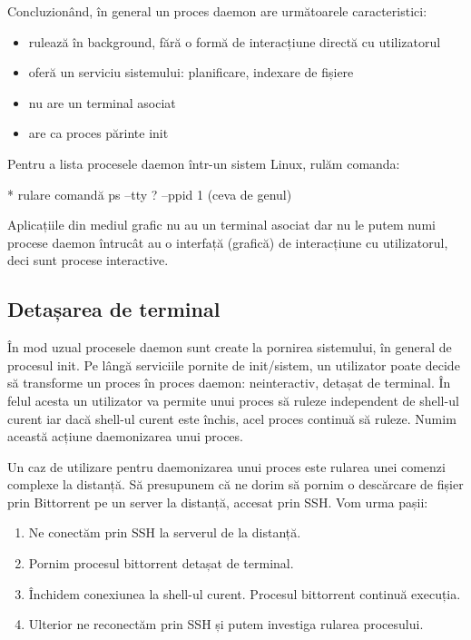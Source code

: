 Concluzionând, în general un proces daemon are următoarele caracteristici:

\begin{itemize}
	\item rulează în background, fără o formă de interacțiune directă cu utilizatorul
	\item oferă un serviciu sistemului: planificare, indexare de fișiere
	\item nu are un terminal asociat
	\item are ca proces părinte init
\end{itemize}

Pentru a lista procesele daemon într-un sistem Linux, rulăm comanda:

* rulare comandă ps --tty ? --ppid 1 (ceva de genul)

Aplicațiile din mediul grafic nu au un terminal asociat dar nu le putem numi
procese daemon întrucât au o interfață (grafică) de interacțiune cu
utilizatorul, deci sunt procese interactive.

\subsection{Detașarea de terminal}

În mod uzual procesele daemon sunt create la pornirea sistemului, în general de
procesul init. Pe lângă serviciile pornite de init/sistem, un utilizator poate
decide să transforme un proces în proces daemon: neinteractiv, detașat de
terminal. În felul acesta un utilizator va permite unui proces să ruleze
independent de shell-ul curent iar dacă shell-ul curent este închis, acel proces
continuă să ruleze. Numim această acțiune daemonizarea unui proces.

Un caz de utilizare pentru daemonizarea unui proces este rularea unei comenzi
complexe la distanță. Să presupunem că ne dorim să pornim o descărcare de fișier
prin Bittorrent pe un server la distanță, accesat prin SSH. Vom urma pașii:

\begin{enumerate}
	\item Ne conectăm prin SSH la serverul de la distanță.
	\item Pornim procesul bittorrent detașat de terminal.
	\item Închidem conexiunea la shell-ul curent. Procesul bittorrent
		continuă execuția.
	\item Ulterior ne reconectăm prin SSH și putem investiga rularea
		procesului.
\end{enumerate}

